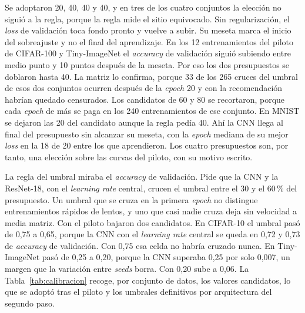 Se adoptaron 20, 40, 40 y 40, y en tres de los cuatro conjuntos la elección no siguió a la regla, porque la regla mide el sitio equivocado. Sin regularización, el \emph{loss} de validación toca fondo pronto y vuelve a subir. Su meseta marca el inicio del sobreajuste y no el final del aprendizaje. En los 12 entrenamientos del piloto de CIFAR-100 y Tiny-ImageNet el \emph{accuracy} de validación siguió subiendo entre medio punto y 10 puntos después de la meseta. Por eso los dos presupuestos se doblaron hasta 40. La matriz lo confirma, porque 33 de los 265 cruces del umbral de esos dos conjuntos ocurren después de la \emph{epoch} 20 y con la recomendación habrían quedado censurados. Los candidatos de 60 y 80 se recortaron, porque cada \emph{epoch} de más se paga en los 240 entrenamientos de ese conjunto. En MNIST se dejaron las 20 del candidato aunque la regla pedía 40. Ahí la CNN llega al final del presupuesto sin alcanzar su meseta, con la \emph{epoch} mediana de su mejor \emph{loss} en la 18 de 20 entre los que aprendieron. Los cuatro presupuestos son, por tanto, una elección sobre las curvas del piloto, con su motivo escrito.

La regla del umbral miraba el \emph{accuracy} de validación. Pide que la CNN y la ResNet-18, con el \emph{learning rate} central, crucen el umbral entre el 30 y el 60\,\% del presupuesto. Un umbral que se cruza en la primera \emph{epoch} no distingue entrenamientos rápidos de lentos, y uno que casi nadie cruza deja sin velocidad a media matriz. Con el piloto bajaron dos candidatos. En CIFAR-10 el umbral pasó de 0,75 a 0,65, porque la CNN con el \emph{learning rate} central se queda en 0,72 y 0,73 de \emph{accuracy} de validación. Con 0,75 esa celda no habría cruzado nunca. En Tiny-ImageNet pasó de 0,25 a 0,20, porque la CNN superaba 0,25 por solo 0,007, un margen que la variación entre \emph{seeds} borra. Con 0,20 sube a 0,06. La Tabla~\ref{tab:calibracion} recoge, por conjunto de datos, los valores candidatos, lo que se adoptó tras el piloto y los umbrales definitivos por arquitectura del segundo paso.

